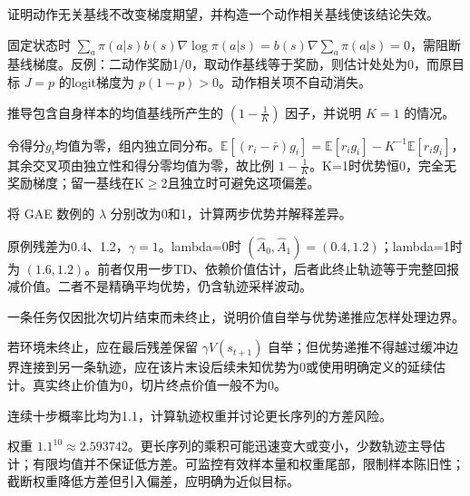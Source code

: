 \begin{exercises}
\begin{exercise} 证明动作无关基线不改变梯度期望，并构造一个动作相关基线使该结论失效。

\begin{solution}
固定状态时 $\sum_a\pi(a|s)b(s)\nabla\log\pi(a|s)=b(s)\nabla\sum_a\pi(a|s)=0$，需阻断基线梯度。反例：二动作奖励1/0，取动作基线等于奖励，则估计处处为0，而原目标 $J=p$ 的logit梯度为 $p(1-p)>0$。动作相关项不自动消失。
\end{solution}
\end{exercise}

\begin{exercise} 推导包含自身样本的均值基线所产生的 $(1-\frac{1}{K})$ 因子，并说明 $K=1$ 的情况。

\begin{solution}
令得分$g_i$均值为零，组内独立同分布。$\mathbb E[(r_i-\bar r)g_i]=\mathbb E[r_ig_i]-K^{-1}\mathbb E[r_ig_i]$，其余交叉项由独立性和得分零均值为零，故比例 $1-\frac{1}{K}$。K=1时优势恒0，完全无奖励梯度；留一基线在K$\ge$2且独立时可避免这项偏差。
\end{solution}
\end{exercise}

\begin{exercise} 将 GAE 数例的 $\lambda$ 分别改为0和1，计算两步优势并解释差异。

\begin{solution}
原例残差为0.4、1.2，$\gamma=1$。lambda=0时 $(\widehat A_0,\widehat A_1)=(0.4,1.2)$；lambda=1时为 $(1.6,1.2)$。前者仅用一步TD、依赖价值估计，后者此终止轨迹等于完整回报减价值。二者不是精确平均优势，仍含轨迹采样波动。
\end{solution}
\end{exercise}

\begin{exercise} 一条任务仅因批次切片结束而未终止，说明价值自举与优势递推应怎样处理边界。

\begin{solution}
若环境未终止，应在最后残差保留 $\gamma V(s_{t+1})$ 自举；但优势递推不得越过缓冲边界连接到另一条轨迹，应在该片末设后续未知优势为0或使用明确定义的延续估计。真实终止价值为0，切片终点价值一般不为0。
\end{solution}
\end{exercise}

\begin{exercise} 连续十步概率比均为1.1，计算轨迹权重并讨论更长序列的方差风险。

\begin{solution}
权重 $1.1^{10}\approx2.593742$。更长序列的乘积可能迅速变大或变小，少数轨迹主导估计；有限均值并不保证低方差。可监控有效样本量和权重尾部，限制样本陈旧性；截断权重降低方差但引入偏差，应明确为近似目标。
\end{solution}
\end{exercise}


\end{exercises}
